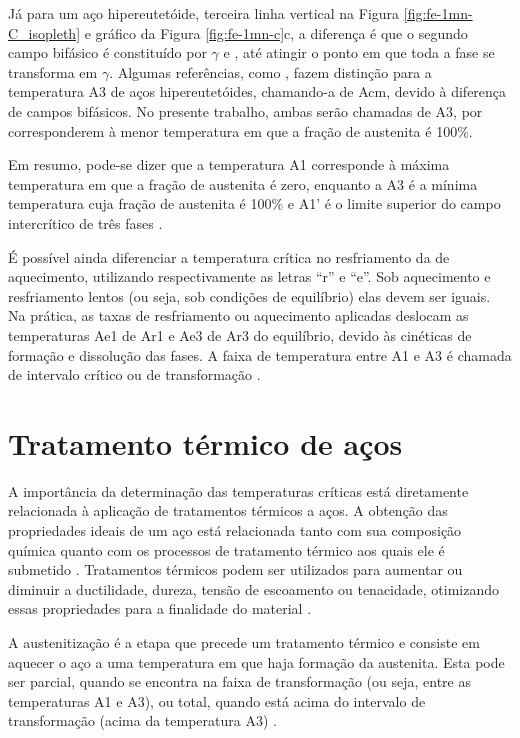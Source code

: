 \documentclass[brazil,tf,epusp]{usp}  %
\begin{document}
Já para um aço hipereutetóide, terceira linha vertical na Figura \ref{fig:fe-1mn-C_isopleth} e gráfico da Figura \ref{fig:fe-1mn-c}c, a diferença é que o segundo campo bifásico é constituído por $\gamma$ e , até atingir o ponto em que toda a fase  se transforma em $\gamma$. Algumas referências, como , fazem distinção para a temperatura A3 de aços hipereutetóides, chamando-a de Acm, devido à diferença de campos bifásicos. No presente trabalho, ambas serão chamadas de A3, por corresponderem à menor temperatura em que a fração de austenita é 100\%.

Em resumo, pode-se dizer que a temperatura A1 corresponde à máxima temperatura em que a fração de austenita é zero, enquanto a A3 é a mínima temperatura cuja fração de austenita é 100\% e A1' é o limite superior do campo intercrítico de três fases \cite{Honeycombe1982}.

É possível ainda diferenciar a temperatura crítica no resfriamento da de aquecimento, utilizando respectivamente as letras ``r'' e ``e''. Sob aquecimento e resfriamento lentos (ou seja, sob condições de equilíbrio) elas devem ser iguais. Na prática, as taxas de resfriamento ou aquecimento aplicadas deslocam as temperaturas Ae1 de Ar1 e Ae3 de Ar3 do equilíbrio, devido às cinéticas de formação e dissolução das fases. A faixa de temperatura entre A1 e A3 é chamada de intervalo crítico ou de transformação \cite{Digges1960}.

\section{Tratamento térmico de aços}

A importância da determinação das temperaturas críticas está diretamente relacionada à aplicação de tratamentos térmicos a aços. A obtenção das propriedades ideais de um aço está relacionada tanto com sua composição química quanto com os processos de tratamento térmico aos quais ele é submetido \cite{Totten2006}. Tratamentos térmicos podem ser utilizados para aumentar ou diminuir a ductilidade, dureza, tensão de escoamento ou tenacidade, otimizando essas propriedades para a finalidade do material \cite{Silva2010}.

A austenitização é a etapa que precede um tratamento térmico e consiste em aquecer o aço a uma temperatura em que haja formação da austenita. Esta pode ser parcial, quando se encontra na faixa de transformação (ou seja, entre as temperaturas A1 e A3), ou total, quando está acima do intervalo de transformação (acima da temperatura A3) \cite{ASM1991}.
\end{document}

